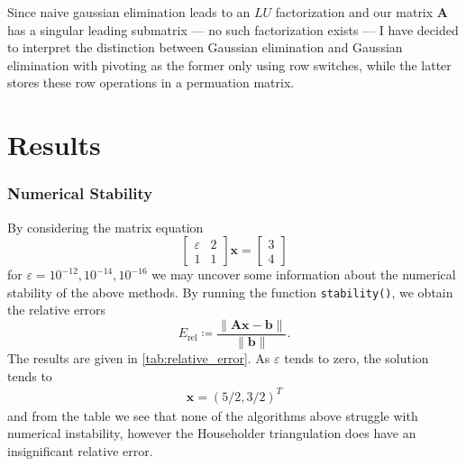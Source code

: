 \documentclass[oneside, a4paper, 12pt, article]{memoir}
\newcommand{\mat}[1]{\boldsymbol{#1}}
\begin{document}
    Since naive gaussian elimination leads to an \( LU \) factorization and
    our matrix \( \mat{A} \) has a singular leading submatrix --- no such
    factorization exists --- I have decided to interpret the distinction
    between Gaussian elimination and Gaussian elimination with pivoting as the
    former only using row switches, while the latter stores these row
    operations in a permuation matrix.

    \chapter{Results}
    \subsection{Numerical Stability}
    
    By considering the matrix equation
    \begin{equation}
        \label{eq:relerrsystem}
        \begin{bmatrix}
            \varepsilon & 2 \\
            1 & 1
        \end{bmatrix}\mat{x} = \begin{bmatrix}
            3 \\
            4
        \end{bmatrix}
    \end{equation}
    for \( \varepsilon = 10^{-12}, 10^{-14}, 10^{-16} \) we may uncover some
    information about the numerical stability of the above methods.
    By running the function \texttt{stability()}, we obtain the relative errors  
    \begin{equation}
        E_{\mathrm{rel}} \coloneqq \frac{\|\mat{A}\mat{x} - \mat{b}\|}{\| \mat{b}\|}.
    \end{equation}
    The results are given in \cref{tab:relative_error}. As \( \varepsilon \)
    tends to zero, the solution tends to 
    \begin{align}
        \mat{x} = (5/2, 3/2)^T
    \end{align}
    and from the table we see that none of the algorithms above struggle with
    numerical instability, however the Householder triangulation does have an
    insignificant relative error.
    
\end{document}
